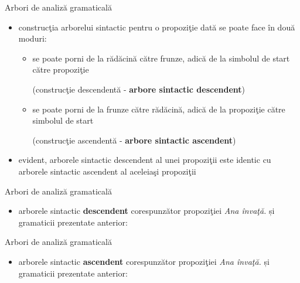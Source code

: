 \documentclass[pdf]{beamer}
\begin{document}
\begin{frame}{Arbori de analiză gramaticală}
\begin{itemize}
\item
construcţia arborelui sintactic pentru o propoziţie dată se poate face în două moduri:
\begin{itemize}
\item
se poate porni de la rădăcină către frunze, adică de la simbolul de start către propoziţie

(construcţie descendentă - \textbf{arbore sintactic descendent})
\item
se poate porni de la frunze către rădăcină, adică de la propoziţie către simbolul de start

(construcţie ascendentă - \textbf{arbore sintactic ascendent})
\end{itemize}
\item
evident, arborele sintactic descendent al unei propoziţii este identic cu arborele sintactic ascendent al aceleiaşi propoziţii
\end{itemize}
\end{frame}



\begin{frame}{Arbori de analiză gramaticală}
\begin{itemize}
\item
arborele sintactic \textbf{descendent} corespunzător propoziţiei \textit{Ana învaţă.} și gramaticii prezentate anterior:

\begin{figure}[H]
\centering
{}
\end{figure}
\end{itemize}
\end{frame}



\begin{frame}{Arbori de analiză gramaticală}
\begin{itemize}
\item
arborele sintactic \textbf{ascendent} corespunzător propoziţiei \textit{Ana învaţă.} și gramaticii prezentate anterior:

\begin{figure}[H]
\centering
{}
\end{figure}
\end{itemize}
\end{frame}
\end{document}
